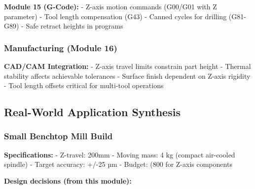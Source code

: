 \documentclass[
]{article}
\begin{document}
\textbf{Module 15 (G-Code):} - Z-axis motion commands (G00/G01 with Z
parameter) - Tool length compensation (G43) - Canned cycles for drilling
(G81-G89) - Safe retract heights in programs

\subsubsection{Manufacturing (Module 16)}\label{manufacturing-module-16}

\textbf{CAD/CAM Integration:} - Z-axis travel limits constrain part
height - Thermal stability affects achievable tolerances - Surface
finish dependent on Z-axis rigidity - Tool length offsets critical for
multi-tool operations

\subsection{Real-World Application
Synthesis}\label{real-world-application-synthesis}

\subsubsection{Small Benchtop Mill
Build}\label{small-benchtop-mill-build}

\textbf{Specifications:} - Z-travel: 200mm - Moving mass: 4 kg (compact
air-cooled spindle) - Target accuracy: +/-25 µm - Budget: (800 for
Z-axis components

\textbf{Design decisions (from this module):}
\end{document}
